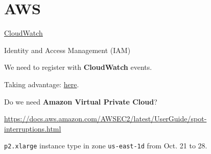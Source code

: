 \chapter{AWS}
\label{ch:aws}

\href{https://docs.aws.amazon.com/cloudwatch/index.html}{CloudWatch}

Identity and Access Management (IAM)

We need to register with \textbf{CloudWatch} events.

Taking advantage:
\href{https://aws.amazon.com/blogs/compute/taking-advantage-of-amazon-ec2-spot-instance-interruption-notices/}{here}.

Do we need \textbf{Amazon Virtual Private Cloud}?

\url{https://docs.aws.amazon.com/AWSEC2/latest/UserGuide/spot-interruptions.html}




\texttt{p2.xlarge} instance type in zone \texttt{us-east-1d} from Oct. 21 to 28.


